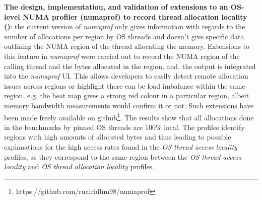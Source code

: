 \documentclass{paper}\usepackage{graphicx}
\begin{document}
\textbf{The design, implementation, and validation of extensions to an OS-level NUMA profiler (numaprof) to record thread allocation locality ()}: the current version of \textit{numaprof} only gives information with regards to the number of allocations per region by OS threads and doesn't give specific data outlining the NUMA region of the thread allocating the memory. Extensions to this feature in \textit{numaprof} were carried out to record the NUMA region of the calling thread and the bytes allocated in the region, and, the output is integrated into the \textit{numaprof} UI. This allows developers to easily detect remote allocation issues across regions or highlight there can be load imbalance within the same region, e.g. the heat map gives a strong red colour in a particular region, albeit memory bandwidth measurements would confirm it or not. Such extensions have been made freely available on github\footnote{https://github.com/ruairidhm98/numaprof}. The results show that all allocations done in the benchmarks by pinned OS threads are 100\% local. The profiles identify regions with high amounts of allocated bytes and thus leading to possible explanations for the high access rates found in the \textit{OS thread access locality} profiles, as they correspond to the same region between the \textit{OS thread access locality} and \textit{OS thread allocation locality} profiles.
\end{document}
